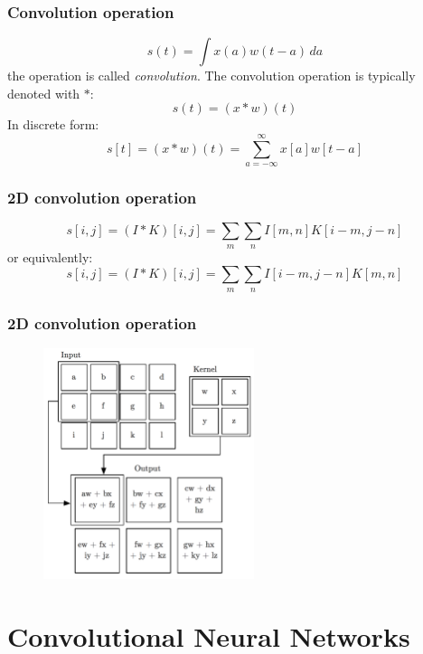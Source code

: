 \documentclass{beamer}
\begin{document}
\begin{frame}
  \frametitle{Convolution operation}

  \begin{equation*}
    s(t)=\int x(a)w(t-a)\, da
  \end{equation*}
  the operation is called \emph{convolution}. The convolution operation is typically denoted with $*$:
  \begin{equation*}
    s(t)=(x*w)(t)
  \end{equation*}
  In discrete form:
  \begin{equation*}
    s[t]=(x*w)(t)=\sum_{a=-\infty}^{\infty}x[a]w[t-a]
  \end{equation*}
\end{frame}

\begin{frame}
  \frametitle{2D convolution operation}

  \begin{equation*}
    s[i,j]=(I*K)[i,j]=\sum_{m}\sum_{n}I[m,n]K[i-m, j-n]
  \end{equation*}
  or equivalently:
  \begin{equation*}
    s[i,j]=(I*K)[i,j]=\sum_{m}\sum_{n}I[i-m, j-n]K[m,n]
  \end{equation*}
\end{frame}

\begin{frame}
  \frametitle{2D convolution operation}
  
 \begin{figure}
    \centering
    \includegraphics[width=0.55\textwidth]{convolution_operation.png}
  \end{figure}
\end{frame}

\section{Convolutional Neural Networks}
\end{document}
